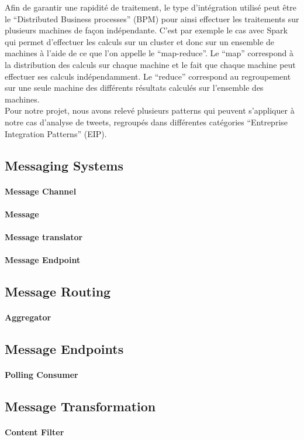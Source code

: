   Afin de garantir une rapidité de traitement, le type d'intégration utilisé peut être le ``Distributed Business processes'' (BPM) pour ainsi effectuer les traitements sur plusieurs machines de façon indépendante. C'est par exemple le cas avec Spark qui permet d'effectuer les calculs sur un cluster et donc sur un ensemble de machines à l'aide de ce que l'on appelle le ``map-reduce''. Le ``map'' correspond à la distribution des calculs sur chaque machine et le fait que chaque machine peut effectuer ses calculs indépendamment. Le ``reduce'' correspond au regroupement sur une seule machine des différents résultats calculés sur l'ensemble des machines. \\

  Pour notre projet, nous avons relevé plusieurs patterns qui peuvent s'appliquer à notre cas d'analyse de tweets, regroupés dans différentes catégories ``Entreprise Integration Patterns'' (EIP).

  \subsection{Messaging Systems}
    \paragraph{Message Channel}
    \paragraph{Message}
    \paragraph{Message translator}
    \paragraph{Message Endpoint}

  \subsection{Message Routing}
    \paragraph{Aggregator}

  \subsection{Message Endpoints}
    \paragraph{Polling Consumer}

  \subsection{Message Transformation}
    \paragraph{Content Filter}
